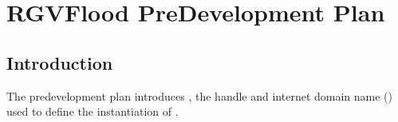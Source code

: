 \documentclass[letterpaper,12pt,english]{book}
\begin{document}
\section{RGVFlood Pre\sphinxhyphen{}Development Plan}
\label{\detokenize{predevelopment/index:rgvflood-pre-development-plan}}\label{\detokenize{predevelopment/index::doc}}

\subsection{Introduction}
\label{\detokenize{predevelopment/introduction:introduction}}\label{\detokenize{predevelopment/introduction::doc}}
\sphinxAtStartPar
The predevelopment plan introduces {\hyperref[\detokenize{glossary:term-RGVFlood}]{}}, the handle and internet domain name ({\hyperref[\detokenize{glossary:term-RGVFlood.com}]{}}) used to define the {\hyperref[\detokenize{glossary:term-LRGV}]{}} instantiation of {\hyperref[\detokenize{glossary:term-REON.cc}]{}}.
\end{document}
